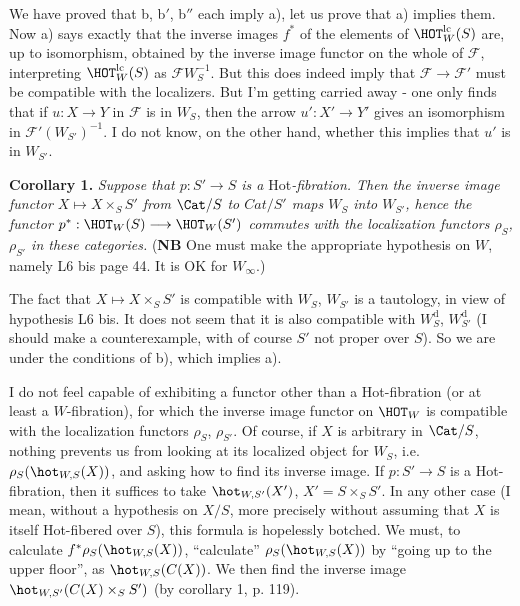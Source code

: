 We have proved that b, b$'$, b$''$ each imply a), let us prove that a) implies them. Now a) says exactly that the inverse images $f^*$ of the elements of $\HOT_W^{\mathrm{lc}}(S)$
are, up to isomorphism, obtained by the inverse image functor on the whole of $\mathcal{F}$, interpreting $\HOT_W^{\mathrm{lc}}(S)$ as $\mathcal{F}W_S^{-1}$. But this does indeed imply that $\mathcal{F} \longrightarrow \mathcal{F}'$ must be compatible with the localizers. But I'm getting carried away - one only finds that if $u : X \longrightarrow Y$ in $\mathcal{F}$ is in $W_S$, then the arrow $u' : X' \longrightarrow Y'$ gives an isomorphism in $\mathcal{F}'(W_{S'})^{-1}$. I do not know, on the other hand, whether this implies that $u'$ is in $W_{S'}$.

\textbf{Corollary 1.} \textit{Suppose that $p : S' \longrightarrow S$ is a} Hot\textit{-fibration. Then the inverse image functor $X \longmapsto X \times_S S'$ from} $\Cat/S$ \textit{to $\mathit{Cat}/S'$ maps $W_S$ into $W_{S'}$, hence the functor $p^* : \HOT_W(S) \longrightarrow \HOT_W(S')$ commutes with the localization functors $\rho_S$, $\rho_{S'}$ in these categories.} (\textbf{NB} One must make the appropriate hypothesis on $W$, namely L6 bis page 44. It is OK for $W_\infty$.)

The fact that $X \longmapsto X \times_S S'$ is compatible with $W_S$, $W_{S'}$ is a tautology, in view of hypothesis L6 bis. It does not seem that it is also compatible with $W_S^{\mathrm{d}}$, $W_{S'}^{\mathrm{d}}$ (I should make a counterexample, with of course $S'$ not proper over $S$). So we are under the conditions of b), which implies a).


I do not feel capable of exhibiting a functor other than a Hot-fibration (or at least a $W$-fibration), for which the inverse image functor on $\HOT_W$ is compatible with the localization functors $\rho_S$, $\rho_{S'}$. Of course, if $X$ is arbitrary in $\Cat/S$, nothing prevents us from looking at its localized object for $W_S$, i.e. $\rho_S(\hot_{W,S}(X))$, and asking how to find its inverse image. If $p : S' \longrightarrow S$ is a Hot-fibration, then it suffices to take $\hot_{W,S'}(X')$, $X' = S \times_S S'$. In any other case (I mean, without a hypothesis on $X/S$, more %
precisely without assuming that $X$ is itself Hot-fibered over $S$), this formula is hopelessly botched. We must, to calculate $f^*\rho_S(\hot_{W,S}(X))$, ``calculate'' $\rho_S(\hot_{W,S}(X))$ by ``going up to the upper floor'', as $\hot_{W,S}(C(X))$. We then find the inverse image $\hot_{W,S'}(C(X) \times_S S')$ (by corollary 1, p. 119).

